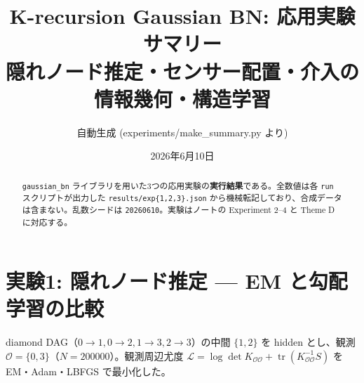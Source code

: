 \documentclass[a4paper,11pt]{ltjsarticle}
\title{K-recursion Gaussian BN: 応用実験サマリー\\\large 隠れノード推定・センサー配置・介入の情報幾何・構造学習}
\author{自動生成 (experiments/make\_summary.py より)}
\date{2026年6月10日}
\newcommand{\tr}{\operatorname{tr}}\newcommand{\rank}{\operatorname{rank}}
\newcommand{\OO}{\mathcal{O}}
\begin{document}
\maketitle
\begin{abstract}
\texttt{gaussian\_bn} ライブラリを用いた3つの応用実験の\textbf{実行結果}である。全数値は各 \texttt{run} スクリプトが出力した \texttt{results/exp\{1,2,3\}.json} から機械転記しており、合成データは含まない。乱数シードは \texttt{20260610}。実験はノートの Experiment 2--4 と Theme D に対応する。
\end{abstract}
\section{実験1: 隠れノード推定 --- EM と勾配学習の比較}
diamond DAG（$0\to1,0\to2,1\to3,2\to3$）の中間 $\{1,2\}$ を hidden とし、観測 $\OO=\{0,3\}$（$N=200000$）。観測周辺尤度 $\mathcal L=\log\det K_{\OO\OO}+\tr(K_{\OO\OO}^{-1}S)$ を EM・Adam・LBFGS で最小化した。
\end{document}
